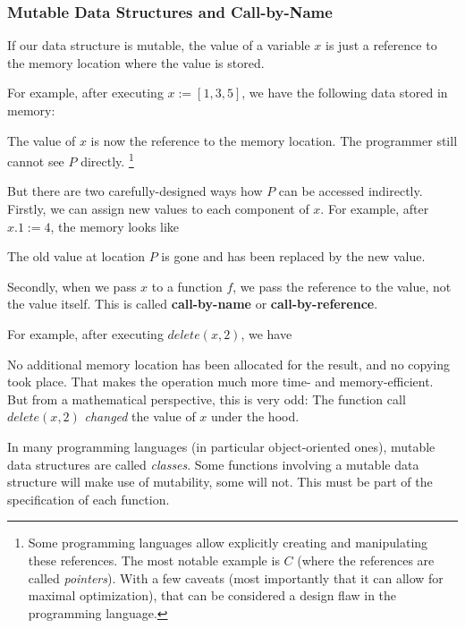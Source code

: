 \subsubsection{Mutable Data Structures and Call-by-Name}

If our data structure is mutable, the value of a variable $x$ is just a reference to the memory location where the value is stored.

For example, after executing $x:=[1,3,5]$, we have the following data stored in memory:
\begin{amemory}
\alocations
{}
\end{amemory}
The value of $x$ is now the reference to the memory location.
The programmer still cannot see $P$ directly.%
\footnote{Some programming languages allow explicitly creating and manipulating these references.
The most notable example is $C$ (where the references are called \emph{pointers}).
With a few caveats (most importantly that it can allow for maximal optimization), that can be considered a design flaw in the programming language.}

But there are two carefully-designed ways how $P$ can be accessed indirectly.
Firstly, we can assign new values to each component of $x$.
For example, after $x.1:=4$, the memory looks like
\begin{amemory}
\alocations
{}
\end{amemory}
The old value at location $P$ is gone and has been replaced by the new value.

Secondly, when we pass $x$ to a function $f$, we pass the reference to the value, not the value itself.
This is called \textbf{call-by-name} or \textbf{call-by-reference}.

For example, after executing $delete(x,2)$, we have
\begin{amemory}
\alocations
{}
\end{amemory}
No additional memory location has been allocated for the result, and no copying took place.
That makes the operation much more time- and memory-efficient.
But from a mathematical perspective, this is very odd: The function call $delete(x,2)$ \emph{changed} the value of $x$ under the hood.
\medskip

In many programming languages (in particular object-oriented ones), mutable data structures are called \emph{classes}.
Some functions involving a mutable data structure will make use of mutability, some will not.
This must be part of the specification of each function.

